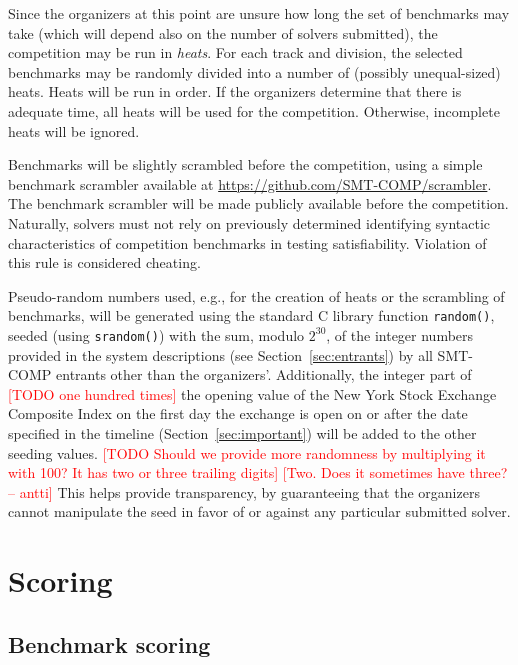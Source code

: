 \documentclass[12pt]{article}
\newcommand{\rem}[1]{\textcolor{red}{[#1]}}
\newcommand{\todo}[1]{\rem{TODO #1}}
\newcommand{\ah}[1]{\rem{#1 -- antti}}
\begin{document}
%
Since the organizers at this point are unsure how long the set of
benchmarks may take (which will depend also on the number of solvers
submitted), the competition may be run in \emph{heats}.  For each
track and division, the selected benchmarks may be randomly divided
into a number of (possibly unequal-sized) heats.  Heats will be run in
order.  If the organizers determine that there is adequate time, all
heats will be used for the competition.  Otherwise, incomplete heats
will be ignored.

%
Benchmarks will be slightly scrambled before the competition, using a simple
benchmark scrambler available at \url{https://github.com/SMT-COMP/scrambler}.
The benchmark scrambler will be made publicly available before the competition.
%
Naturally, solvers must not rely on previously determined identifying
syntactic characteristics of competition benchmarks in testing
satisfiability.  Violation of this rule is considered cheating.

%
Pseudo-random numbers used, e.g., for the creation of heats or the
scrambling of benchmarks, will be generated using the standard C
library function \texttt{random()}, seeded (using \texttt{srandom()})
with the sum, modulo $2^{30}$, of the integer numbers provided in the
system descriptions (see Section~\ref{sec:entrants}) by all SMT-COMP
entrants other than the organizers'.  Additionally, the integer part
of \todo{one hundred times} the opening value of the New York Stock Exchange Composite Index on
the first day the exchange is open on or after the date specified in
the timeline (Section~\ref{sec:important}) will be added to the other
seeding values. \todo{Should we provide more randomness by multiplying
it with 100?  It has two or three trailing digits} \ah{Two.  Does it
sometimes have three?} This helps provide transparency, by guaranteeing that
the organizers cannot manipulate the seed in favor of or against any
particular submitted solver.


\section{Scoring}
\label{sec:scoring}

\subsection{Benchmark scoring}
\label{sec:benchmark-scoring}
\end{document}
